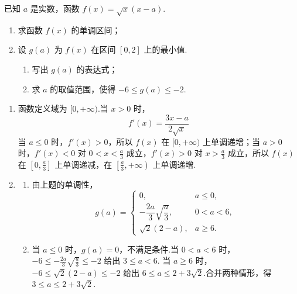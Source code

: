 \begin{problem}
已知 \(a\) 是实数，函数 \(f(x) = \sqrt{x}(x - a)\).

\begin{enumerate}
\item 求函数 \(f(x)\) 的单调区间；
\item 设 \(g(a)\) 为 \(f(x)\) 在区间 \([0, 2]\) 上的最小值.

\begin{enumerate}
\item 写出 \(g(a)\) 的表达式；
\item 求 \(a\) 的取值范围，使得 \(-6 \leqslant g(a) \leqslant -2\).
\end{enumerate}
\end{enumerate}

\begin{solution}
\begin{enumerate}
\item 函数定义域为 \([0,+\infty)\).当 \(x>0\) 时，
\[
f'(x)=\frac{3x-a}{2\sqrt{x}}
\]
当 \(a\leqslant0\) 时，\(f'(x)>0\)，所以 \(f(x)\) 在 \([0,+\infty)\) 上单调递增；当 \(a>0\) 时，\(f'(x)<0\) 对
\(0<x<\frac a3\) 成立，\(f'(x)>0\) 对 \(x>\frac a3\) 成立，所以 \(f(x)\) 在
\(\left[0,\frac a3\right]\) 上单调递减，在 \(\left[\frac a3,+\infty\right)\) 上单调递增.
\item
\begin{enumerate}
\item 由上题的单调性，
\[
g(a)=
\begin{cases}
0,&a\leqslant0,\\
-\dfrac{2a}{3}\sqrt{\dfrac a3},&0<a<6,\\
\sqrt2(2-a),&a\geqslant6.
\end{cases}
\]
\item 当 \(a\leqslant0\) 时，\(g(a)=0\)，不满足条件.当 \(0<a<6\) 时，
\(-6\leqslant-\frac{2a}{3}\sqrt{\frac a3}\leqslant-2\) 给出 \(3\leqslant a<6\).
当 \(a\geqslant6\) 时，
\(-6\leqslant\sqrt2(2-a)\leqslant-2\) 给出
\(6\leqslant a\leqslant2+3\sqrt2\).合并两种情形，得
\(3\leqslant a\leqslant2+3\sqrt2\).
\end{enumerate}
\end{enumerate}
\end{solution}
\end{problem}

